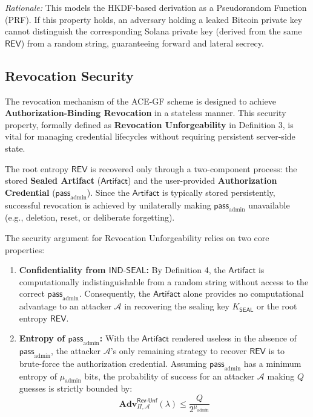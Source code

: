 \documentclass[12pt,a4paper]{article}
\begin{document}
  \noindent \textit{Rationale:} This models the HKDF-based derivation as a Pseudorandom Function (PRF). If this property holds, an adversary holding a leaked Bitcoin private key cannot distinguish the corresponding Solana private key (derived from the same $\mathsf{REV}$) from a random string, guaranteeing forward and lateral secrecy.

  \subsection{Revocation Security}

  The revocation mechanism of the ACE-GF scheme is designed to achieve \textbf{Authorization-Binding Revocation} in a stateless manner. This security property, formally defined as \textbf{Revocation Unforgeability} in Definition 3, is vital for managing credential lifecycles without requiring persistent server-side state.

  The root entropy $\mathsf{REV}$ is recovered only through a two-component process: the stored \textbf{Sealed Artifact} ($\mathsf{Artifact}$) and the user-provided \textbf{Authorization Credential} ($\mathsf{pass}_{\mathrm{admin}}$). Since the $\mathsf{Artifact}$ is typically stored persistently, successful revocation is achieved by unilaterally making $\mathsf{pass}_{\mathrm{admin}}$ unavailable (e.g., deletion, reset, or deliberate forgetting).

  The security argument for Revocation Unforgeability relies on two core properties:

  \begin{enumerate}
   \item \textbf{Confidentiality from $\mathsf{IND\text{-}SEAL}$:} By Definition 4, the $\mathsf{Artifact}$ is computationally indistinguishable from a random string without access to the correct $\mathsf{pass}_{\mathrm{admin}}$. Consequently, the $\mathsf{Artifact}$ alone provides no computational advantage to an attacker $\mathcal{A}$ in recovering the sealing key $K_{\mathsf{SEAL}}$ or the root entropy $\mathsf{REV}$.

   \item \textbf{Entropy of $\mathsf{pass}_{\mathrm{admin}}$:} With the $\mathsf{Artifact}$ rendered useless in the absence of $\mathsf{pass}_{\mathrm{admin}}$, the attacker $\mathcal{A}$'s only remaining strategy to recover $\mathsf{REV}$ is to brute-force the authorization credential. Assuming $\mathsf{pass}_{\mathrm{admin}}$ has a minimum entropy of $\mu_{\mathrm{admin}}$ bits, the probability of success for an attacker $\mathcal{A}$ making $Q$ guesses is strictly bounded by:
   $$\mathbf{Adv}_{\Pi, \mathcal{A}}^{\mathsf{Rev\text{-}Unf}}(\lambda) \le \frac{Q}{2^{\mu_{\mathrm{admin}}}}$$
  \end{enumerate}
\end{document}
